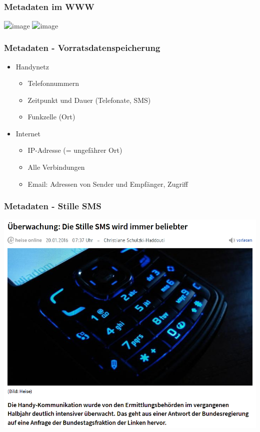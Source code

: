 \documentclass[12pt]{beamer}
\begin{document}
\subsection{}

\begin{frame}
    \frametitle{Metadaten im WWW}
    \begin{center} 
        \includegraphics<1>[width=0.7\textwidth]{img/lightbeam_1.png}
        \includegraphics<2>[width=0.7\textwidth]{img/lightbeam_2.png}
    \end{center}
\end{frame}

\begin{frame}
  \frametitle{Metadaten - Vorratsdatenspeicherung}
  \begin{itemize}
    \item Handynetz
      \begin{itemize}
        \item Telefonnummern
        \item Zeitpunkt und Dauer (Telefonate, SMS)
        \item Funkzelle (Ort)
      \end{itemize}
    \item Internet
      \begin{itemize}
        \item IP-Adresse (= ungefährer Ort)
        \item Alle Verbindungen
        \item Email: Adressen von Sender und Empfänger, Zugriff
      \end{itemize}
  \end{itemize}
\end{frame}

\begin{frame}
  \frametitle{Metadaten - Stille SMS}
    \begin{center}
      \includegraphics[height=0.7\textheight]{img/stille_sms.png}
    \end{center}
\end{frame}
\end{document}
